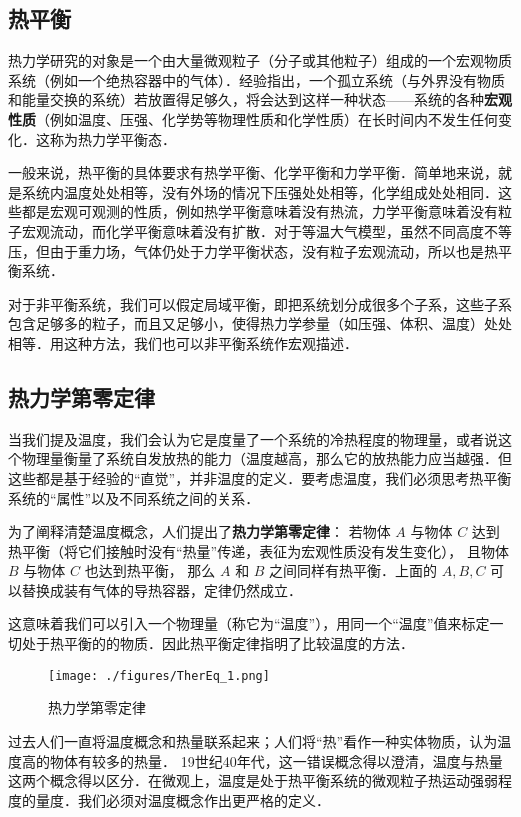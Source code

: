 
\begin{issues}
\issueDraft
\end{issues}

\subsection{热平衡}
热力学研究的对象是一个由大量微观粒子（分子或其他粒子）组成的一个宏观物质系统（例如一个绝热容器中的气体）．经验指出，一个孤立系统（与外界没有物质和能量交换的系统）若放置得足够久，将会达到这样一种状态——系统的各种\textbf{宏观性质}（例如温度、压强、化学势等物理性质和化学性质）在长时间内不发生任何变化．这称为热力学平衡态．

一般来说，热平衡的具体要求有热学平衡、化学平衡和力学平衡．简单地来说，就是系统内温度处处相等，没有外场的情况下压强处处相等，化学组成处处相同．这些都是宏观可观测的性质，例如热学平衡意味着没有热流，力学平衡意味着没有粒子宏观流动，而化学平衡意味着没有扩散．对于等温大气模型，虽然不同高度不等压，但由于重力场，气体仍处于力学平衡状态，没有粒子宏观流动，所以也是热平衡系统．

对于非平衡系统，我们可以假定局域平衡，即把系统划分成很多个子系，这些子系包含足够多的粒子，而且又足够小，使得热力学参量（如压强、体积、温度）处处相等．用这种方法，我们也可以非平衡系统作宏观描述．

\subsection{热力学第零定律}
当我们提及温度，我们会认为它是度量了一个系统的冷热程度的物理量，或者说这个物理量衡量了系统自发放热的能力（温度越高，那么它的放热能力应当越强．但这些都是基于经验的“直觉”，并非温度的定义．要考虑温度，我们必须思考热平衡系统的“属性”以及不同系统之间的关系．

为了阐释清楚温度概念，人们提出了\textbf{热力学第零定律}：
若物体 $A$ 与物体 $C$ 达到热平衡（将它们接触时没有“热量”传递，表征为宏观性质没有发生变化）， 且物体 $B$ 与物体 $C$ 也达到热平衡， 那么 $A$ 和 $B$ 之间同样有热平衡．上面的 $A,B,C$ 可以替换成装有气体的导热容器，定律仍然成立．

这意味着我们可以引入一个物理量（称它为“温度”），用同一个“温度”值来标定一切处于热平衡的的物质．因此热平衡定律指明了比较温度的方法．
\begin{figure}[ht]
\centering
\texttt{[image: ./figures/TherEq\_1.png]}
\caption{热力学第零定律} \label{TherEq_fig1}
\end{figure}

过去人们一直将温度概念和热量联系起来；人们将“热”看作一种实体物质，认为温度高的物体有较多的热量． 19世纪40年代，这一错误概念得以澄清，温度与热量这两个概念得以区分．在微观上，温度是处于热平衡系统的微观粒子热运动强弱程度的量度．我们必须对温度概念作出更严格的定义．

